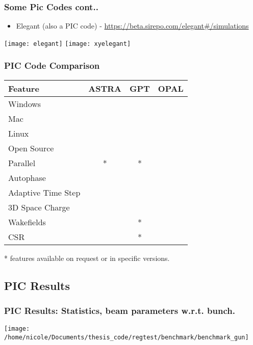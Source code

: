 \documentclass[professionalfonts,t]{beamer}
\newcommand{\cmark}{\ding{51}}%
\newcommand{\xmark}{\ding{55}}%
\begin{document}
\begin{frame}
\frametitle{Some Pic Codes cont..}
\begin{itemize}
	\item Elegant (also a PIC code) - \url{https://beta.sirepo.com/elegant\#/simulations}
\end{itemize}

\centering
\texttt{[image: elegant]}%
\texttt{[image: xyelegant]}
\end{frame}


\begin{frame}
\frametitle{PIC Code Comparison}
\centering
\vspace{-0.2cm}
\begin{table}
	\begin{minipage}{0.8\textwidth}
		\begin{center}	
			\begin{tabular}{l c c c}
				\toprule
				\textbf{Feature} & \textbf{ASTRA} & \textbf{GPT} & \textbf{OPAL}\\
				\midrule
				Windows     		& \cmark & \cmark & \alert \xmark \\ 
				Mac         		& \cmark & \cmark & \cmark \\
				Linux       		& \cmark & \cmark & \cmark \\
				Open Source 		& \alert \xmark & \alert \xmark & \color{black!30!green}\cmark \\
				Parallel    		& \alert \xmark * & \alert \xmark * & \color{black!30!green}\cmark \\
				Autophase   		& \cmark & \xmark & \cmark \\
				Adaptive Time Step 	& \xmark & \cmark & \xmark \\
				3D Space Charge 	& \cmark & \cmark & \cmark \\
				Wakefields  		& \cmark & \xmark * & \color{black!30!green}\cmark \\
				CSR         		& \alert \xmark & \xmark * & \color{black!30!green}\cmark \\
				\bottomrule
			\end{tabular}
		\end{center}
	\end{minipage}
\end{table}
* features available on request or in specific versions.
\end{frame}




\subsection{PIC Results}
\begin{frame}
\frametitle{PIC Results: Statistics, beam parameters w.r.t. bunch.}
\vspace{-0.5em}
\centering

	\texttt{[image: /home/nicole/Documents/thesis\_code/regtest/benchmark/benchmark\_gun]}
\end{frame}
\end{document}
